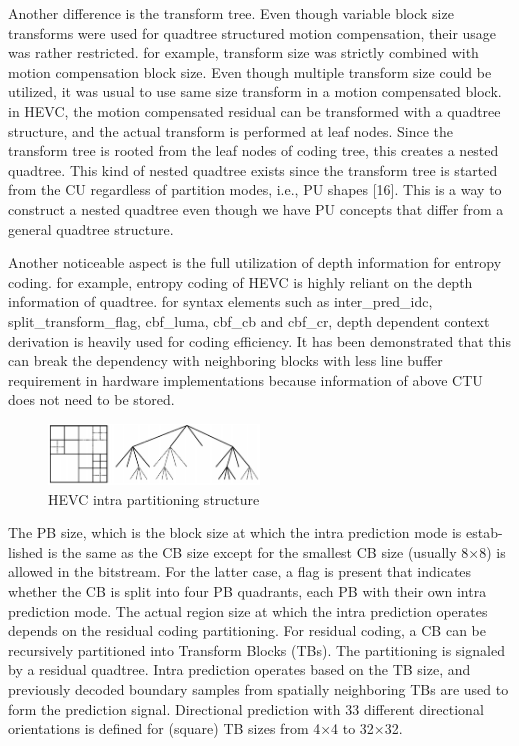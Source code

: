 \documentclass[journal,sort]{IEEEtran}
\begin{document}
Another difference is the transform tree. Even though variable block size transforms were used for quadtree structured motion compensation, their usage was rather restricted. for example, transform size was strictly combined with motion compensation block size. Even though multiple transform size could be utilized, it was usual to use same size transform in a motion compensated block. in HEVC, the motion compensated residual can be transformed with a quadtree structure, and the actual transform is performed at leaf nodes. Since the transform tree is rooted from the leaf nodes of coding tree, this creates a nested quadtree. This kind of nested quadtree exists since the transform tree is started from the CU regardless of partition modes, i.e., PU shapes [16]. This is a way to construct a nested quadtree even though we have PU concepts that differ from a general quadtree structure.

Another noticeable aspect is the full utilization of depth information for entropy coding. for example, entropy coding of HEVC is highly reliant on the depth information of quadtree. for syntax elements such as inter\_pred\_idc, split\_transform\_flag, cbf\_luma, cbf\_cb and cbf\_cr, depth dependent context derivation is heavily used for coding efficiency. It has been demonstrated that this can break the dependency with neighboring blocks with less line buffer requirement in hardware implementations because information of above CTU does not need to be stored.

\begin{figure}[htbp!]
	\centering
	\includegraphics[width=0.5\textwidth]{1.png}
	\caption{HEVC intra partitioning structure}
	\label{HEVC-part}
\end{figure}


The PB size, which is the block size at which the intra prediction mode is estab-lished is the same as the CB size except for the smallest CB size (usually 8×8) is allowed in the bitstream. For the latter case, a flag is present that indicates whether the CB is split into four PB quadrants, each PB with their own intra prediction mode. The actual region size at which the intra prediction operates depends on the residual coding partitioning. 
For residual coding, a CB can be recursively partitioned into Transform Blocks (TBs). The partitioning is signaled by a residual quadtree. Intra prediction operates based on the TB size, and previously decoded boundary samples from spatially neighboring TBs are used to form the prediction signal. Directional prediction with 33 different directional orientations is defined for (square) TB sizes from 4×4 to 32×32. 
\end{document}
